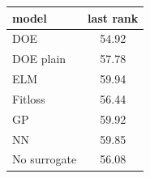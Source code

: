 \begin{tabular}{|lc|}
\hline
model & last rank\\
\hline
DOE & 54.92 \\
DOE plain & 57.78 \\
ELM & 59.94 \\
Fitloss & 56.44 \\
GP & 59.92 \\
NN & 59.85 \\
No surrogate & 56.08 \\
\hline
\end{tabular}
